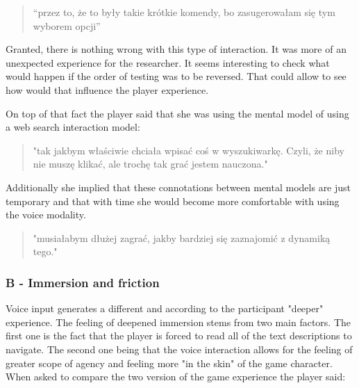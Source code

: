 \begin{quote}
``przez to, że to były takie krótkie komendy, bo zasugerowałam się tym wyborem opcji''
\end{quote}

Granted, there is nothing wrong with this type of interaction. It was more of an unexpected experience for the researcher. It seems interesting to check what would happen if the order of testing was to be reversed. That could allow to see how would that influence the player experience.


On top of that fact the player said that she was using the mental model of using a web search interaction model:

\begin{quote}
    "tak jakbym właściwie chciała wpisać coś w wyszukiwarkę. Czyli, że niby nie muszę klikać, ale trochę tak grać jestem nauczona."
\end{quote}

Additionally she implied that these connotations between mental models are just temporary and that with time she would become more comfortable with using the voice modality.

\begin{quote}
    "musiałabym dłużej zagrać, jakby bardziej się zaznajomić z dynamiką tego."
\end{quote}




\subsubsection{B - Immersion and friction}


Voice input generates a different and according to the participant "deeper" experience. The feeling of deepened immersion stems from two main factors. The first one is the fact that the player is forced to read all of the text descriptions to navigate. The second one being that the voice interaction allows for the feeling of greater scope of agency and feeling more "in the skin" of the game character. When asked to compare the two version of the game experience the player said:

